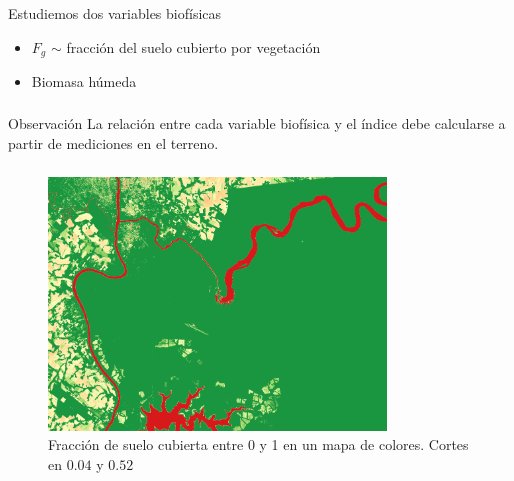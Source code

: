 \documentclass[handout]{beamer}
\begin{document}
\begin{frame}
    \frametitle{\subsecname}
    Estudiemos dos variables biofísicas
    \begin{itemize}[<+->]
        \item $F_g$ $\sim$ fracción del suelo cubierto por vegetación
        \item Biomasa húmeda
    \end{itemize}
\end{frame}

\begin{frame}
    \frametitle{\subsecname}
    \begin{block}{Observación}
        La relación entre cada variable biofísica y el índice debe
        calcularse a partir de mediciones en el terreno.
    \end{block}
\end{frame}

\begin{frame}
    \frametitle{\subsecname}
    \begin{figure}
    \begin{center}
        \includegraphics[width=0.8\textwidth]{imagenes/fg.png}
    \end{center}
    \caption{Fracción de suelo cubierta entre 0 y 1 en un mapa de colores.
        Cortes en $0.04$ y $0.52$}
    \end{figure}

\end{frame}
\end{document}
